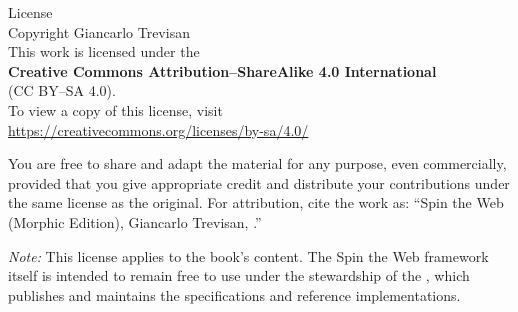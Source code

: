 \cleardoublepage
\thispagestyle{empty}
\begin{center}
{\Large License}\\[1.25em]
Copyright \textcopyright{} \the\year{} Giancarlo Trevisan\\[0.75em]
This work is licensed under the\\
{\bfseries Creative Commons Attribution--ShareAlike 4.0 International}\\
(CC BY--SA 4.0).\\[0.75em]
To view a copy of this license, visit\\
\url{https://creativecommons.org/licenses/by-sa/4.0/}
\end{center}

\vfill
\noindent You are free to share and adapt the material for any purpose, even commercially, provided that you give appropriate credit and distribute your contributions under the same license as the original. For attribution, cite the work as: “Spin the Web (Morphic Edition), Giancarlo Trevisan, \the\year.”

\medskip

\noindent \textit{Note:} This license applies to the book’s content. The Spin the Web framework itself is intended to remain free to use under the stewardship of the \organization{}, which publishes and maintains the specifications and reference implementations.

